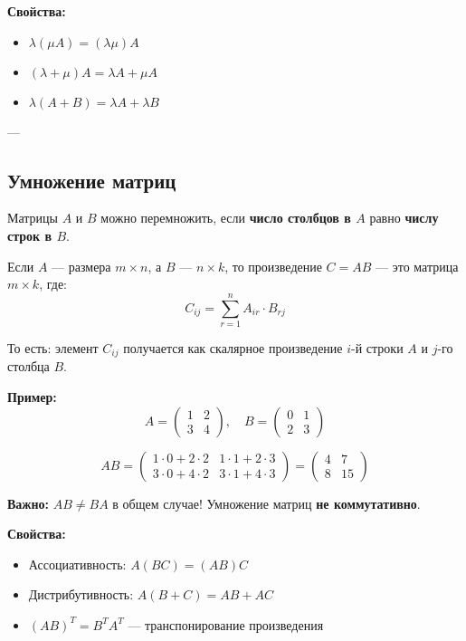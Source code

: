\textbf{Свойства:}
\begin{itemize}
  \item $\lambda (\mu A) = (\lambda \mu) A$
  \item $(\lambda + \mu) A = \lambda A + \mu A$
  \item $\lambda (A + B) = \lambda A + \lambda B$
\end{itemize}

---

\subsection*{Умножение матриц}

Матрицы $A$ и $B$ можно перемножить, если \textbf{число столбцов в $A$} равно \textbf{числу строк в $B$}.

Если $A$ — размера $m \times n$, а $B$ — $n \times k$, то произведение $C = AB$ — это матрица $m \times k$, где:
\[
C_{ij} = \sum_{r=1}^{n} A_{ir} \cdot B_{rj}
\]

То есть: элемент $C_{ij}$ получается как скалярное произведение $i$-й строки $A$ и $j$-го столбца $B$.

\textbf{Пример:}
\[
A =
\begin{pmatrix}
1 & 2 \\
3 & 4
\end{pmatrix}, \quad
B =
\begin{pmatrix}
0 & 1 \\
2 & 3
\end{pmatrix}
\]

\[
AB =
\begin{pmatrix}
1\cdot0 + 2\cdot2 & 1\cdot1 + 2\cdot3 \\
3\cdot0 + 4\cdot2 & 3\cdot1 + 4\cdot3
\end{pmatrix}
=
\begin{pmatrix}
4 & 7 \\
8 & 15
\end{pmatrix}
\]

\textbf{Важно:} $AB \ne BA$ в общем случае! Умножение матриц \textbf{не коммутативно}.

\textbf{Свойства:}
\begin{itemize}
  \item Ассоциативность: $A(BC) = (AB)C$
  \item Дистрибутивность: $A(B + C) = AB + AC$
  \item $(AB)^T = B^T A^T$ — транспонирование произведения
\end{itemize}

